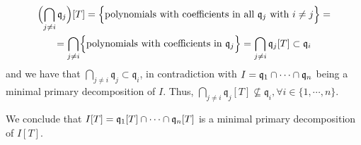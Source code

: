 \begin{problem}
\begin{enumerate}[label=(\theproblem.\arabic*),ref=\theproblem.\arabic*]
\begin{sol}
\begin{itemize}
\begin{gather*}
                    \Bigl( \bigcap_{j \neq i} \mathfrak{q}_j \Bigr)[T] = \Bigl\{ \text{polynomials with coefficients in all } \mathfrak{q}_j \text{ with } i \neq j \Bigr\} =\\
                    = \bigcap_{j \neq i} \Bigl\{ \text{polynomials with coefficients in } \mathfrak{q}_j \Bigr\} = \bigcap_{j \neq i} \mathfrak{q}_j[T] \subset \mathfrak{q}_i\\
                \end{gather*}
                and we have that $\bigcap_{j \neq i} \mathfrak{q}_j \subset \mathfrak{q}_i$, in contradiction with $I = \mathfrak{q}_1 \cap \cdots \cap \mathfrak{q}_n$ being a minimal primary decomposition of $I$.
                Thus, $\bigcap_{j \neq i} \mathfrak{q}_j[T] \nsubseteq \mathfrak{q}_i, \forall i \in \{ 1, \cdots, n \}$.
            \end{itemize}
            We conclude that $I[T] = \mathfrak{q}_1[T] \cap \cdots \cap \mathfrak{q}_n[T]$ is a minimal primary decomposition of $I[T]$.
        \end{sol}

    \end{enumerate}
\end{problem}